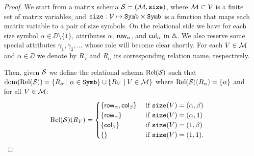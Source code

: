 \begin{proof}
We start from a matrix schema $\mathcal{S}=(\mathcal{M},\texttt{size})$, where $\mathcal{M}\subset \mathcal{V}$ is a finite set of matrix variables, 
and $\texttt{size}: \mathcal{V} \mapsto \texttt{Symb}\times \texttt{Symb}$ is a function that maps each matrix variable to a pair of size symbols. 
On the relational side we have for each size symbol $\alpha\in\DD\setminus\{1\}$, attributes $\alpha$, $\mathsf{row}_\alpha$, 
and $\mathsf{col}_\alpha$ in $\mathbb{A}$. We also reserve some special attributes $\gamma_1,\gamma_2,\ldots$ whose role will become clear shortly.
For each $V\in\mathcal{M}$ and $\alpha \in \DD$ we denote
by $R_V$ and $R_\alpha$ its corresponding relation name, respectively. 

Then, given $\mathcal{S}$ we define the relational 
schema $\text{Rel}(\mathcal{S})$ such that $\operatorname{dom}(\text{Rel}(\mathcal{S})) =  \{R_\alpha \mid \alpha\in\texttt{Symb}\} \cup \{R_V \mid V \in \mathcal{M}\}$
where $\text{Rel}(\mathcal{S})(R_\alpha) = \{\alpha\}$ and for all $V\in\mathcal{M}$:
\[
\text{Rel}(\mathcal{S})(R_V) = \begin{cases}
\lbrace\mathsf{row}_\alpha,\mathsf{col}_\beta \rbrace & \text{ if $ \texttt{size}(V)=(\alpha,\beta)$} \\
\lbrace\mathsf{row}_\alpha \rbrace & \text{ if $ \texttt{size}(V)=(\alpha,1)$} \\
\lbrace\mathsf{col}_\beta \rbrace  &
\text{ if $ \texttt{size}(V)=(1,\beta)$} \\
\lbrace\rbrace & \text{ if $\texttt{size}(V)=(1,1)$}.
\end{cases}
\]


\end{proof}
